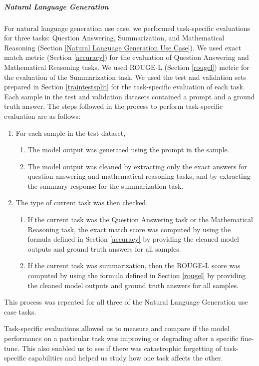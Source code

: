 \subparagraph{Natural Language Generation}
For natural language generation use case, we performed task-specific evaluations for three tasks: Question Answering, Summarization, and Mathematical Reasoning (Section \ref{Natural Language Generation Use Case}). We used exact match metric (Section \ref{accuracy}) for the evaluation of Question Answering and Mathematical Reasoning tasks. We used ROUGE-L (Section \ref{rougel}) metric for the evaluation of the Summarization task. We used the test and validation sets prepared in Section \ref{traintestsplit} for the task-specific evaluation of each task. Each sample in the test and validation datasets contained a prompt and a ground truth answer. The steps followed in the process to perform task-specific evaluation are as follows:
\begin{enumerate}
\item For each sample in the test dataset,
\begin{enumerate} [label*=\arabic*.]
\item The model output was generated using the prompt in the sample.
\item The model output was cleaned by extracting only the exact answers for question answering and mathematical reasoning tasks, and by extracting the summary response for the summarization task.
\end{enumerate}
\item The type of current task was then checked.
\begin{enumerate} [label*=\arabic*.]
\item If the current task was the Question Answering task or the Mathematical Reasoning task, the exact match score was computed by using the formula defined in Section \ref{accuracy} by providing the cleaned model outputs and ground truth answers for all samples.
\item If the current task was summarization, then the ROUGE-L score was computed by using the formula defined in Section \ref{rougel} by providing the cleaned model outputs and ground truth answers for all samples.
\end{enumerate}
\end{enumerate}

This process was repeated for all three of the Natural Language Generation use case tasks.

Task-specific evaluations allowed us to measure and compare if the model performance on a particular task was improving or degrading after a specific fine-tune. This also enabled us to see if there was catastrophic forgetting of task-specific capabilities and helped us study how one task affects the other.


